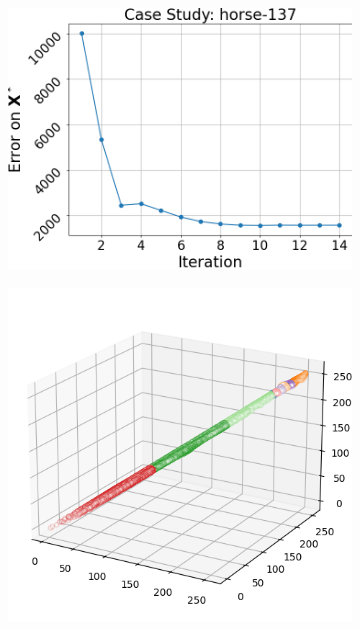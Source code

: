 \begin{figure}[htbp]
\begin{subfigure}[t]{0.32\textwidth}
    \end{subfigure}
    \begin{subfigure}[t]{0.32\textwidth}
        \includegraphics[width=\linewidth]{../../python_code/plots/kmeans/horse-137/elbow_curve.png}
    \end{subfigure}
    \begin{subfigure}[t]{0.32\textwidth}
        \includegraphics[width=\linewidth]{../../python_code/plots/kmeans/horse-137/clusters_elev20_azim-60.png}

\end{subfigure}
\end{figure}
